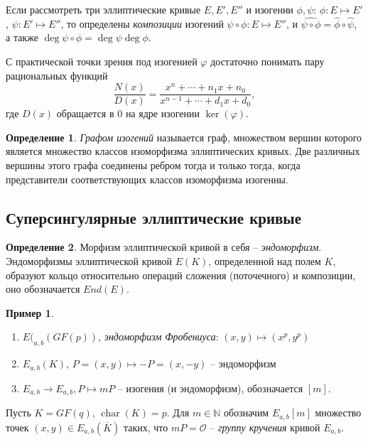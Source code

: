 \documentclass[a4paper,12pt]{article}
\newcommand{\NN}{\mathbb{N}}
\DeclareMathOperator{\Char}{char}
\theoremstyle{definition}
\newtheorem{definition}{Определение}
\newtheorem{example}{Пример}
\begin{document}
Если рассмотреть три эллиптические кривые $E,E',E''$ и изогении $\phi,\psi$: $\phi:E\mapsto E'$, $\psi:E'\mapsto E''$,
то определены \emph{композиции} изогений $\psi\circ\phi:E\mapsto E''$, и $\widehat{\psi\circ\phi}=\hat{\phi}\circ\hat{\psi}$, а также $\deg \psi\circ\phi=\deg\psi \deg\phi$.

С практической точки зрения под изогенией $\varphi$ достаточно понимать пару рациональных функций
$$
\frac{N(x)}{D(x)}=\frac{x^n+\cdots+n_1x+n_0}{x^{n-1}+\cdots+d_1x+d_0},
$$
где $D(x)$ обращается в $0$ на ядре изогении $\ker(\varphi)$.

\begin{definition}
\emph{Графом изогений} называется граф, множеством вершин которого является множество классов изоморфизма эллиптических кривых. 
Две различных вершины этого графа соединены ребром тогда и только тогда, когда представители соответствующих классов изоморфизма изогенны.
\end{definition}

\subsection{Суперсингулярные эллиптические кривые}

\begin{definition}
Морфизм эллиптической кривой в себя -- \emph{эндоморфизм}.
Эндоморфизмы эллиптической кривой $E(K)$, определенной над полем $K$, образуют кольцо относительно операций сложения (поточечного) и композиции, оно обозначается $End(E)$. 
\end{definition}

\begin{example}
\begin{enumerate}

\item $E(_{a,b}(GF(p))$, \emph{эндоморфизм Фробениуса}: $(x,y)\mapsto (x^p,y^p)$

\item $E_{a,b}(K)$, $P=(x,y)\mapsto -P=(x,-y)$ -- эндоморфизм

\item $E_{a,b}\to E_{a,b}, P\mapsto mP$ -- изогения (и эндоморфизм), обозначается $[m]$.
\end{enumerate}
\end{example}

Пусть $K=GF(q)$, $\Char (K)=p$. Для $m\in\NN$ обозначим $E_{a,b}[m]$ множество точек $(x,y)\in E_{a,b}(\overline{K})$ таких, что $mP=\mathcal{O}$ -- \emph{группу кручения} кривой $E_{a,b}$. 
\end{document}

